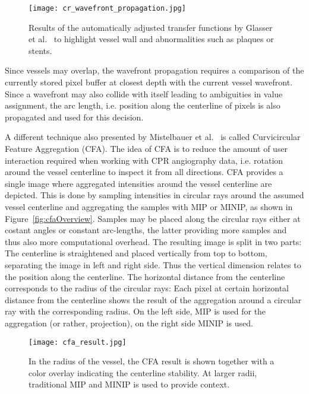 \begin{figure}[htb]
  \centering
  \texttt{[image: cr\_wavefront\_propagation.jpg]}
  \caption{\label{fig:crWavefrontPropagation} Results of the automatically adjusted transfer functions by Glasser et al.~\cite{glasser2010automatic} to highlight vessel wall and abnormalities such as plaques or stents.}
  \cite{mistelbauer2010automated}
\end{figure}
Since vessels may overlap, the wavefront propagation requires a comparison of the currently stored pixel buffer at closest depth with the current vessel wavefront. Since a wavefront may also collide with itself leading to ambiguities in value assignment, the arc length, i.e. position along the centerline of pixels is also propagated and used for this decision.

A different technique also presented by Mistelbauer et al.~\cite{mistelbauer2013vessel} is called Curvicircular Feature Aggregation (CFA). The idea of CFA is to reduce the amount of user interaction required when working with CPR angiography data, i.e. rotation around the vessel centerline to inspect it from all directions. CFA provides a single image where aggregated intensities around the vessel centerline are depicted. This is done by sampling intensities in circular rays around the assumed vessel centerline and aggregating the samples with MIP or MINIP, as shown in Figure~\ref{fig:cfaOverview}. Samples may be placed along the circular rays either at costant angles or constant arc-lengths, the latter providing more samples and thus also more computational overhead. The resulting image is split in two parts: The centerline is straightened and placed vertically from top to bottom, separating the image in left and right side. Thus the vertical dimension relates to the position along the centerline. The horizontal distance from the centerline corresponds to the radius of the circular rays: Each pixel at certain horizontal distance from the centerline shows the result of the aggregation around a circular ray with the corresponding radius. On the left side, MIP is used for the aggregation (or rather, projection), on the right side MINIP is used.
\begin{figure}[htb]
  \centering
  \texttt{[image: cfa\_result.jpg]}
  \caption{\label{fig:cfaResult} In the radius of the vessel, the CFA result is shown together with a color overlay indicating the centerline stability. At larger radii, traditional MIP and MINIP is used to provide context.}
  \cite{mistelbauer2013vessel}
\end{figure}
